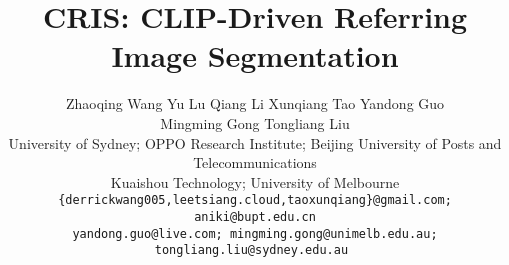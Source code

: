 \documentclass[10pt,twocolumn,letterpaper]{article}
\begin{document}
\title{CRIS: CLIP-Driven Referring Image Segmentation}

\author{
  Zhaoqing Wang\quad
  Yu Lu\quad
  Qiang Li\quad
  Xunqiang Tao\quad
  Yandong Guo\\
  Mingming Gong\quad
  Tongliang Liu\\
  \small{University of Sydney};
  \small{OPPO Research Institute};
  \small{Beijing University of Posts and Telecommunications}\\
  \small{Kuaishou Technology};
  \small{University of Melbourne}\\
  \tt\small \{derrickwang005,leetsiang.cloud,taoxunqiang\}@gmail.com;
  \tt\small{aniki@bupt.edu.cn}\\
  \tt\small{yandong.guo@live.com};
  \tt\small{mingming.gong@unimelb.edu.au};
  \tt\small{tongliang.liu@sydney.edu.au}
}
\maketitle
\end{document}
